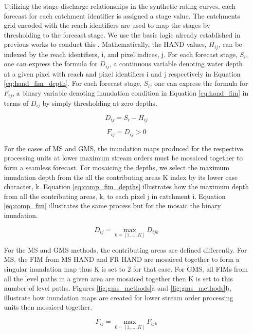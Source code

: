 Utilizing the stage-discharge relationships in the synthetic rating curves, each forecast for each catchment identifier is assigned a stage value. 
The catchments grid encoded with the reach identifiers are used to map the stages by thresholding to the forecast stage.
We use the basic logic already established in previous works to conduct this \cite{nobre2016hand,liu2016cybergis,maidment2017conceptual}.
Mathematically, the HAND values, $H_{ij}$, can be indexed by the reach identifiers, i, and pixel indices, j.
For each forecast stage, $S_i$, one can express the formula for $D_{ij}$, a continuous variable denoting water depth at a given pixel with reach and pixel identifiers i and j respectively in Equation \ref{eq:hand_fim_depth}.
For each forecast stage, $S_i$, one can express the formula for $F_{ij}$, a binary variable denoting inundation condition in Equation \ref{eq:hand_fim} in terms of $D_{ij}$ by simply thresholding at zero depths.
%
\begin{linenomath*}
\begin{equation}
\label{eq:hand_fim_depth}
    D_{ij} = S_i - H_{ij}
\end{equation}
\end{linenomath*}
%
\begin{linenomath*}
\begin{equation}
\label{eq:hand_fim}
    F_{ij} = D_{ij} > 0
\end{equation}
\end{linenomath*}
%
For the cases of MS and GMS, the inundation maps produced for the respective processing units at lower maximum stream orders must be mosaiced together to form a seamless forecast.
For mosaicing the depths, we select the maximum inundation depth from the all the contributing areas K index by its lower case character, k.
Equation \ref{eq:comp_fim_depths} illustrates how the maximum depth from all the contributing areas, k, to each pixel j in catchment i.
Equation \ref{eq:comp_fim} illustrates the same process but for the mosaic the binary inundation.
%
\begin{linenomath*}
\begin{equation}
\label{eq:comp_fim_depths}
    D_{ij} = \max_{k=[1,...,K]} D_{ijk}
\end{equation}
\end{linenomath*}
%
For the MS and GMS methods, the contributing areas are defined differently.
For MS, the FIM from MS HAND and FR HAND are mosaiced together to form a singular inundation map thus K is set to 2 for that case.
For GMS, all FIMs from all the level paths in a given area are mosaiced together then K is set to this number of level paths.
Figures \ref{fig:gms_methods}a and \ref{fig:gms_methods}b, illustrate how inundation maps are created for lower stream order processing units then mosaiced together.
%
\begin{linenomath*}
\begin{equation}
\label{eq:comp_fim}
    F_{ij} = \max_{k=[1,...,K]} F_{ijk}
\end{equation}
\end{linenomath*}
%
